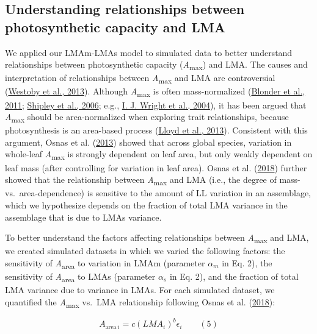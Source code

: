 \documentclass[
  12pt,
  letterpaper,
  DIV=11,
  numbers=noendperiod]{scrartcl}
\begin{document}
\hypertarget{understanding-relationships-between-photosynthetic-capacity-and-lma}{%
\subsection{Understanding relationships between photosynthetic capacity
and
LMA}\label{understanding-relationships-between-photosynthetic-capacity-and-lma}}

We applied our LMAm-LMAs model to simulated data to better understand
relationships between photosynthetic capacity
(\emph{A}\textsubscript{max}) and LMA. The causes and interpretation of
relationships between \emph{A}\textsubscript{max} and LMA are
controversial (\protect\hyperlink{ref-Westoby2013}{Westoby et al.,
2013}). Although \emph{A}\textsubscript{max} is often mass-normalized
(\protect\hyperlink{ref-Blonder2011}{Blonder et al., 2011};
\protect\hyperlink{ref-Shipley2006}{Shipley et al., 2006}; e.g.,
\protect\hyperlink{ref-Wright2004a}{I. J. Wright et al., 2004}), it has
been argued that \emph{A}\textsubscript{max} should be area-normalized
when exploring trait relationships, because photosynthesis is an
area-based process (\protect\hyperlink{ref-Lloyd2013}{Lloyd et al.,
2013}). Consistent with this argument, Osnas et al.
(\protect\hyperlink{ref-Osnas2013}{2013}) showed that across global
species, variation in whole-leaf \emph{A}\textsubscript{max} is strongly
dependent on leaf area, but only weakly dependent on leaf mass (after
controlling for variation in leaf area). Osnas et al.
(\protect\hyperlink{ref-Osnas2018}{2018}) further showed that the
relationship between \emph{A}\textsubscript{max} and LMA (i.e., the
degree of mass- vs.~area-dependence) is sensitive to the amount of LL
variation in an assemblage, which we hypothesize depends on the fraction
of total LMA variance in the assemblage that is due to LMAs variance.

To better understand the factors affecting relationships between
\emph{A}\textsubscript{max} and LMA, we created simulated datasets in
which we varied the following factors: the sensitivity of
\emph{A}\textsubscript{area} to variation in LMAm (parameter
\(\alpha_m\) in Eq. 2), the sensitivity of \emph{A}\textsubscript{area}
to LMAs (parameter \(\alpha_s\) in Eq. 2), and the fraction of total LMA
variance due to variance in LMAs. For each simulated dataset, we
quantified the \emph{A}\textsubscript{max} vs.~LMA relationship
following Osnas et al. (\protect\hyperlink{ref-Osnas2018}{2018}):

\[
A_{\mathrm{area} \, i} = c (LMA_i)^{b}\epsilon_i \qquad(5)
\]
\end{document}
